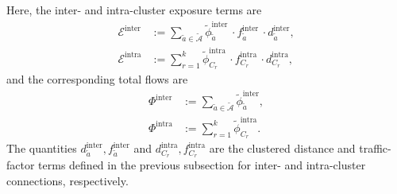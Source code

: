 \documentclass[lettersize,journal]{IEEEtran}
\begin{document}
Here, the inter- and intra-cluster exposure terms are
\begin{equation}
\label{cluster_def}
\begin{aligned}
  \mathcal{E}^{\mathrm{inter}}
  &:= \sum_{\tilde{a} \in \tilde{\mathcal{A}}}
        \tilde{\phi}^{\mathrm{inter}}_{\tilde{a}}\, \cdot
        f^{\mathrm{inter}}_{\tilde{a}}\, \cdot
        d^{\mathrm{inter}}_{\tilde{a}}, \\[0.4em]
  \mathcal{E}^{\mathrm{intra}}
  &:= \sum_{r=1}^k
        \tilde{\phi}^{\mathrm{intra}}_{C_r}\, \cdot
        f^{\mathrm{intra}}_{C_r}\, \cdot
        d^{\mathrm{intra}}_{C_r},
\end{aligned}
\end{equation}
and the corresponding total flows are
\begin{equation}
\begin{aligned}
  \Phi^{\mathrm{inter}}
  &:= \sum_{\tilde{a} \in \tilde{\mathcal{A}}}
        \tilde{\phi}^{\mathrm{inter}}_{\tilde{a}}, \\[0.4em]
  \Phi^{\mathrm{intra}}
  &:= \sum_{r=1}^k
        \tilde{\phi}^{\mathrm{intra}}_{C_r}.
\end{aligned}
\end{equation}
The quantities $d^{\mathrm{inter}}_{\tilde{a}}, f^{\mathrm{inter}}_{\tilde{a}}$ and
$d^{\mathrm{intra}}_{C_r}, f^{\mathrm{intra}}_{C_r}$ are the clustered distance and traffic-factor
terms defined in the previous subsection for inter- and intra-cluster connections, respectively.



\end{document}
